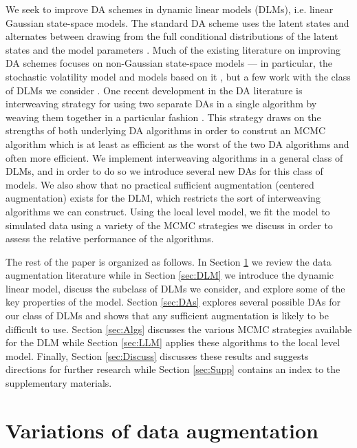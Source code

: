 \documentclass[12pt]{article}
\begin{document}
We seek to improve DA schemes in dynamic linear models (DLMs), i.e. linear Gaussian state-space models. The standard DA scheme uses the latent states and alternates between drawing from the full conditional distributions of the latent states and the model parameters \citep{fruhwirth1994data,carter1994gibbs}. Much of the existing literature on improving DA schemes focuses on non-Gaussian state-space models --- in particular, the stochastic volatility model and models based on it \citep{shephard1996statistical,fruhwirth2003bayesian,roberts2004bayesian,bos2006inference,strickland2008parameterisation,fruhwirth2008heston,kastner2013ancillarity}, but a few work with the class of DLMs we consider \citep{fruhwirth2004efficient}. One recent development in the DA literature is interweaving strategy for using two separate DAs in a single algorithm by weaving them together in a particular fashion \citep{yu2011center}. This strategy draws on the strengths of both underlying DA algorithms in order to construt an MCMC algorithm which is at least as efficient as the worst of the two DA algorithms and often more efficient. We implement interweaving algorithms in a general class of DLMs, and in order to do so we introduce several new DAs for this class of models. We also show that no practical sufficient augmentation (centered augmentation) exists for the DLM, which restricts the sort of interweaving algorithms we can construct. Using the local level model, we fit the model to simulated data using a variety of the MCMC strategies we discuss in order to assess the relative performance of the algorithms.

The rest of the paper is organized as follows. In Section \ref{sec:DA} we review the data augmentation literature while in Section \ref{sec:DLM} we introduce the dynamic linear model, discuss the subclass of DLMs we consider, and explore some of the key properties of the model. Section \ref{sec:DAs} explores several possible DAs for our class of DLMs and shows that any sufficient augmentation is likely to be difficult to use. Section \ref{sec:Algs} discusses the various MCMC strategies available for the DLM while Section \ref{sec:LLM} applies these algorithms to the local level model. Finally, Section \ref{sec:Discuss} discusses these results and suggests directions for further research while Section \ref{sec:Supp} contains an index to the supplementary materials.

\section{Variations of data augmentation}\label{sec:DA}
\end{document}
